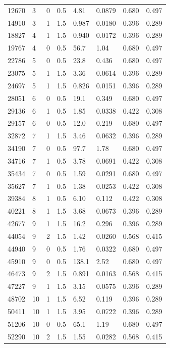 \documentclass[preview]{standalone}
\begin{document}
{{\begin{tabular}{L{1.2cm}C{1.2cm} C{0.3cm}C{0.5cm} C{1.4cm}C{1.4cm} C{1.4cm}C{1.4cm}}
  12670  &     3  & 0     & 0.5 &  4.81  & 0.0879  & 0.680 &  0.497   \\ 
  14910  &     3  & 1     & 1.5 &  0.987  & 0.0180  & 0.396 &  0.289   \\ 
  18827  &     4  & 1     & 1.5 &  0.940  & 0.0172  & 0.396 &  0.289   \\ 
  19767  &     4  & 0     & 0.5 &  56.7  & 1.04  & 0.680 &  0.497   \\ 
  22786  &     5  & 0     & 0.5 &  23.8  & 0.436  & 0.680 &  0.497   \\ 
  23075  &     5  & 1     & 1.5 &  3.36  & 0.0614  & 0.396 &  0.289   \\ 
  24697  &     5  & 1     & 1.5 &  0.826  & 0.0151  & 0.396 &  0.289   \\ 
  28051  &     6  & 0     & 0.5 &  19.1  & 0.349  & 0.680 &  0.497   \\ 
  29136  &     6  & 1     & 0.5 &  1.85  & 0.0338  & 0.422 &  0.308   \\ 
  29157  &     6  & 0     & 0.5 &  12.0  & 0.219  & 0.680 &  0.497   \\ 
  32872  &     7  & 1     & 1.5 &  3.46  & 0.0632  & 0.396 &  0.289   \\ 
  34190  &     7  & 0     & 0.5 &  97.7  & 1.78  & 0.680 &  0.497   \\ 
  34716  &     7  & 1     & 0.5 &  3.78  & 0.0691  & 0.422 &  0.308   \\ 
  35434  &     7  & 0     & 0.5 &  1.59  & 0.0291  & 0.680 &  0.497   \\ 
  35627  &     7  & 1     & 0.5 &  1.38  & 0.0253  & 0.422 &  0.308   \\ 
  39384  &     8  & 1     & 0.5 &  6.10  & 0.112  & 0.422 &  0.308   \\ 
  40221  &     8  & 1     & 1.5 &  3.68  & 0.0673  & 0.396 &  0.289   \\ 
  42677  &     9  & 1     & 1.5 &  16.2  & 0.296  & 0.396 &  0.289   \\ 
  44054  &     9  & 2     & 1.5 &  1.42  & 0.0260  & 0.568 &  0.415   \\ 
  44940  &     9  & 0     & 0.5 &  1.76  & 0.0322  & 0.680 &  0.497   \\ 
  45910  &     9  & 0     & 0.5 &  138.1  & 2.52  & 0.680 &  0.497   \\ 
  46473  &     9  & 2     & 1.5 &  0.891  & 0.0163  & 0.568 &  0.415   \\ 
  47227  &     9  & 1     & 1.5 &  3.15  & 0.0575  & 0.396 &  0.289   \\ 
  48702  &    10  & 1     & 1.5 &  6.52  & 0.119  & 0.396 &  0.289   \\ 
  50411  &    10  & 1     & 1.5 &  3.95  & 0.0722  & 0.396 &  0.289   \\ 
  51206  &    10  & 0     & 0.5 &  65.1  & 1.19  & 0.680 &  0.497   \\ 
  52290  &    10  & 2     & 1.5 &  1.55  & 0.0282  & 0.568 &  0.415   \\ 
\hline 
\end{tabular} 

}}
\end{document}
